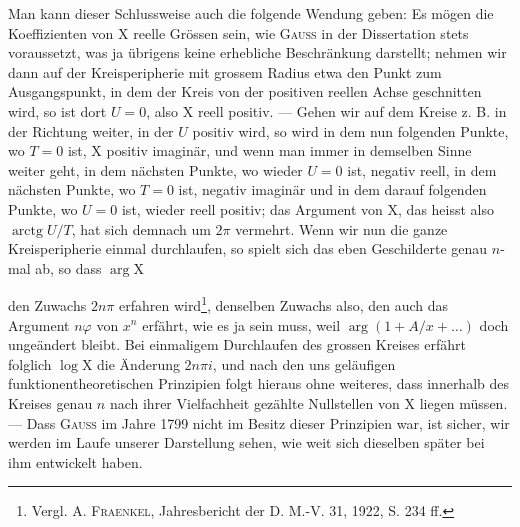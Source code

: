Man kann dieser Schlussweise auch die folgende Wendung geben: Es mögen
die Koeffizienten von \(\mathrm{X}\) reelle Grössen sein, wie \textsc{Gauss} in der Dissertation
stets voraussetzt, was ja übrigens keine erhebliche Beschränkung darstellt;
nehmen wir dann auf der Kreisperipherie mit grossem Radius etwa den Punkt
zum Ausgangspunkt, in dem der Kreis von der positiven reellen Achse geschnitten
wird, so ist dort \(U=0\), also \(\mathrm{X}\) reell positiv. — Gehen wir auf
dem Kreise z. B. in der Richtung weiter, in der \(U\) positiv wird, so wird in
dem nun folgenden Punkte, wo \(T=0\) ist, \(\mathrm{X}\) positiv imaginär, und wenn man
immer in demselben Sinne weiter geht, in dem nächsten Punkte, wo wieder
\(U=0\) ist, negativ reell, in dem nächsten Punkte, wo \(T=0\) ist, negativ
imaginär und in dem darauf folgenden Punkte, wo \(U=0\) ist, wieder reell
positiv; das Argument von \(\mathrm{X}\), das heisst also \(\operatorname{arctg}U/T\), hat sich demnach
um \(2\pi\) vermehrt. Wenn wir nun die ganze Kreisperipherie einmal durchlaufen,
so spielt sich das eben Geschilderte genau \(n\)-mal ab, so dass \(\arg\mathrm{X}\)\par
\clearpage{}
\noindent den Zuwachs \(2n\pi\) erfahren wird\footnote{Vergl. \textsc{A. Fraenkel}, Jahresbericht der D. M.-V. 31, 1922, S. 234 ff.}, denselben Zuwachs also, den auch das
Argument \(n\varphi\) von \(x^n\) erfährt, wie es ja sein muss, weil \(\arg(1+A/x+\ldots)\) doch
ungeändert bleibt. Bei einmaligem Durchlaufen des grossen Kreises erfährt
folglich \(\log\mathrm{X}\) die Änderung \(2n\pi i\), und nach den uns geläufigen funktionentheoretischen
Prinzipien folgt hieraus ohne weiteres, dass innerhalb des Kreises
genau \(n\) nach ihrer Vielfachheit gezählte Nullstellen von \(\mathrm{X}\) liegen müssen. —
Dass \textsc{Gauss} im Jahre 1799 nicht im Besitz dieser Prinzipien war, ist sicher,
wir werden im Laufe unserer Darstellung sehen, wie weit sich dieselben später
bei ihm entwickelt haben.
